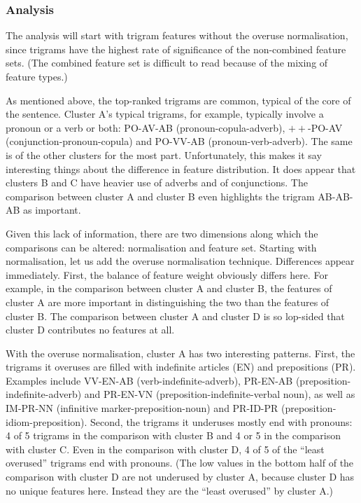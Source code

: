\subsubsection{Analysis}

The analysis will start with trigram features without the overuse
normalisation, since trigrams have the highest rate of significance of
the non-combined feature sets. (The combined feature set is difficult
to read because of the mixing of feature types.)

As mentioned above, the top-ranked trigrams are common, typical
of the core of the sentence. Cluster A's typical trigrams, for
example, typically involve a pronoun or a verb or both: PO-AV-AB
(pronoun-copula-adverb), $++$-PO-AV (conjunction-pronoun-copula) and
PO-VV-AB (pronoun-verb-adverb). The same is of the
other clusters for the most part. Unfortunately, this makes it say
interesting things about the difference in feature distribution. It
does appear that clusters B and C have heavier use of adverbs and of
conjunctions. The comparison between cluster A and cluster B even
highlights the trigram AB-AB-AB as important.

Given this lack of information, there are two dimensions along which
the comparisons can be altered: normalisation and feature
set. Starting with normalisation, let us add the overuse normalisation
technique. Differences appear immediately. First, the balance of
feature weight obviously differs here. For example, in the comparison
between cluster A and cluster B, the features of cluster A are more
important in distinguishing the two than the features of cluster
B. The comparison between cluster A and cluster D is so lop-sided that
cluster D contributes no features at all.

With the overuse normalisation, cluster A has two interesting
patterns. First, the trigrams it overuses are filled with indefinite
articles (EN) and prepositions (PR). Examples include VV-EN-AB
(verb-indefinite-adverb), PR-EN-AB (preposition-indefinite-adverb) and
PR-EN-VN (preposition-indefinite-verbal noun), as well as IM-PR-NN
(infinitive marker-preposition-noun) and PR-ID-PR
(preposition-idiom-preposition). Second, the trigrams it underuses
mostly end with pronouns: 4 of 5 trigrams in the comparison with
cluster B and 4 or 5 in the comparison with cluster C. Even in the
comparison with cluster D, 4 of 5 of the ``least overused'' trigrams
end with pronouns. (The low values in the bottom half of the
comparison with cluster D are not underused by cluster A, because
cluster D has no unique features here. Instead they are the ``least
overused'' by cluster A.)

